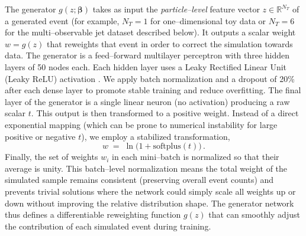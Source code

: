         The generator $g(z;\boldsymbol{\beta})$ takes as input the \emph{particle--level} feature vector $z \in \mathbb{R}^{N_T}$ of a generated event (for example, $N_T=1$ for one--dimensional toy data or $N_T=6$ for the multi--observable jet dataset described below).
        It outputs a scalar weight $w=g(z)$ that reweights that event in order to correct the simulation towards data.
        The generator is a feed--forward multilayer perceptron with three hidden layers of 50 nodes each.
        Each hidden layer uses a Leaky Rectified Linear Unit (Leaky ReLU) activation .
        We apply batch normalization and a dropout of 20\% after each dense layer to promote stable training and reduce overfitting.
        The final layer of the generator is a single linear neuron (no activation) producing a raw scalar $t$.
        This output is then transformed to a positive weight.
        Instead of a direct exponential mapping (which can be prone to numerical instability for large positive or negative $t$), we employ a stabilized transformation,
        \[ 
            w \;=\; \ln\!\Big(1 + \text{softplus}(t)\Big)\,.
        \]
         Finally, the set of weights ${w_i}$ in each mini--batch is normalized so that their average is unity.
         This batch--level normalization means the total weight of the simulated sample remains consistent (preserving overall event counts) and prevents trivial solutions where the network could simply scale all weights up or down without improving the relative distribution shape.
         The generator network thus defines a differentiable reweighting function $g(z)$ that can smoothly adjust the contribution of each simulated event during training.

